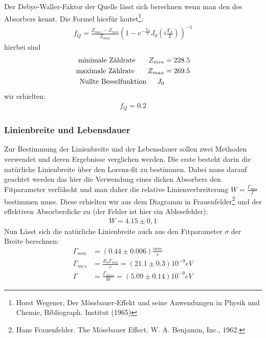 \documentclass[12pt]{article}
\begin{document}
Der Debye-Waller-Faktor der Quelle lässt sich berechnen wenn man den des Absorbers kennt. Die Formel hierfür lautet\footnote{Horst Wegener, Der Mössbauer-Effekt und seine Anwendungen in Physik und Chemie, Bibliograph. Institut (1965)}:
\begin{align*}
f_Q=\frac{Z_{max} - Z_{min}}{Z_{max}} \left( 1 - e^{-\frac{T_A}{2}} J_0 \left( i \frac{T_A}{2} \right) \right)^{-1}
\end{align*}
hierbei sind 
\begin{align*}
  \textnormal{minimale Zählrate } \hspace{15pt} Z_{min} &= 228.5 \\
  \textnormal{maximale Zählrate } \hspace{15pt} Z_{max} &= 269.5 \\
  \textnormal{Nullte Besselfunktion} \hspace{15pt} J_0
\end{align*}
wir erhielten:
\begin{align*}
f_Q = 0.2
\end{align*}


\subsubsection{Linienbreite und Lebensdauer}
Zur Bestimmung der Linienbreite und der Lebensdauer sollen zwei Methoden verwendet und deren Ergebnisse verglichen werden. Die erste besteht darin
die natürliche Linienbreite über den Lorenz-fit zu bestimmen. Dabei muss darauf geachtet werden das hier die Verwendung eines dicken Absorbers den
Fitparameter verfälscht und man daher die relative Linienverbreiterung $W = \frac{\Gamma_{mes}}{\Gamma}$ bestimmen muss. Diese erhielten wir aus dem 
Diagramm in Frauenfelder\footnote{Hans Frauenfelder. The Mössbauer Effect. W. A. Benjamin, Inc., 1962.} und der effektiven Absorberdicke zu (der Fehler ist hier ein Ablesefehler):
\begin{align*}
 W = 4.15 \pm 0,1
\end{align*}
Nun Lässt sich die  natürliche Linienbreite auch aus den Fitparameter $\sigma$ der Breite berechnen:
\begin{align*}
 \Gamma_{mm} &= (0.44 \pm 0.006) \frac{mm}{s} \\
 \Gamma_{mes} &= \frac{E_0\Gamma_{mm}}{c} = (21.1 \pm 0.3) 10^{-9}eV \\
 \Gamma &= \frac{\Gamma_{mess}}{W} = (5.09 \pm 0.14) 10^{-9} eV
\end{align*}
\end{document}
